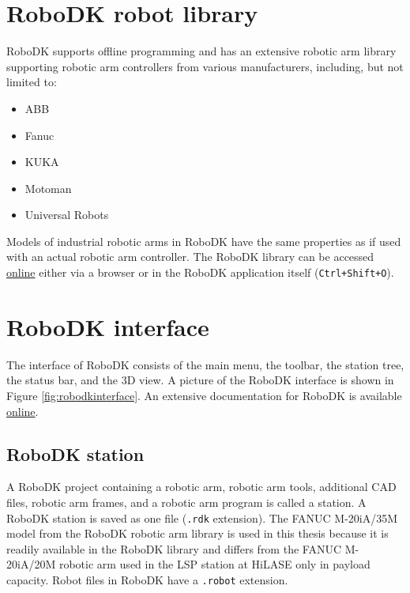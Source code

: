 \section{RoboDK robot library}

RoboDK supports offline programming and has an extensive robotic arm library supporting robotic arm controllers from various manufacturers, including, but not limited to:

\begin{itemize}
    \item ABB 
    \item Fanuc 
    \item KUKA 
    \item Motoman 
    \item Universal Robots 
\end{itemize}
Models of industrial robotic arms in RoboDK have the same properties as if used with an actual robotic arm controller. The RoboDK library can be accessed \href{https://robodk.com/library}{online} either via a browser or in the RoboDK application itself (\texttt{Ctrl+Shift+O}).


\section{RoboDK interface}

The interface of RoboDK consists of the main menu, the toolbar, the station tree, the status bar, and the 3D view. A picture of the RoboDK interface is shown in Figure \ref{fig:robodkinterface}. An extensive documentation for RoboDK is available \href{https://robodk.com/doc/en/Basic-Guide.html#Start}{online}.

\subsection{RoboDK station}

A RoboDK project containing a robotic arm, robotic arm tools, additional CAD files, robotic arm frames, and a robotic arm program is called a station. A RoboDK station is saved as one file (\texttt{.rdk} extension).  The FANUC M-20iA/35M model from the RoboDK robotic arm library is used in this thesis because it is readily available in the RoboDK library and differs from the FANUC M-20iA/20M robotic arm used in the LSP station at HiLASE only in payload capacity. Robot files in RoboDK have a \texttt{.robot} extension.

